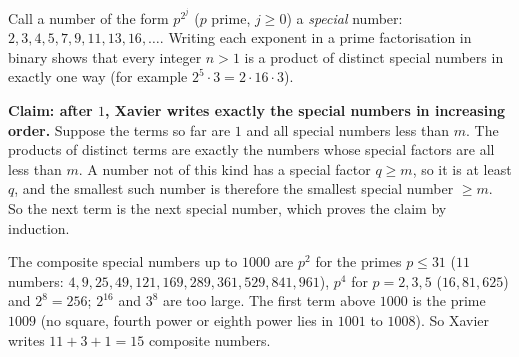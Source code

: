 Call a number of the form $p^{2^j}$ ($p$ prime, $j\ge0$) a \emph{special} number: $2,3,4,5,7,9,11,13,16,\dots$. Writing each exponent in a prime factorisation in binary shows that every integer $n>1$ is a product of distinct special numbers in exactly one way (for example $2^5\cdot3=2\cdot16\cdot3$).

\textbf{Claim: after $1$, Xavier writes exactly the special numbers in increasing order.} Suppose the terms so far are $1$ and all special numbers less than $m$. The products of distinct terms are exactly the numbers whose special factors are all less than $m$. A number not of this kind has a special factor $q\ge m$, so it is at least $q$, and the smallest such number is therefore the smallest special number $\ge m$. So the next term is the next special number, which proves the claim by induction.

The composite special numbers up to $1000$ are $p^2$ for the primes $p\le31$ ($11$ numbers: $4,9,25,49,121,169,289,361,529,841,961$), $p^4$ for $p=2,3,5$ ($16,81,625$) and $2^8=256$; $2^{16}$ and $3^8$ are too large. The first term above $1000$ is the prime $1009$ (no square, fourth power or eighth power lies in $1001$ to $1008$). So Xavier writes $11+3+1=\boxed{15}$ composite numbers.
